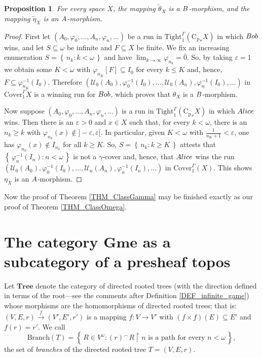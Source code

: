 \documentclass[12pt]{amsart}
\newtheorem{prop}[thm]{Proposition}
\theoremstyle{definition}
\newcommand{\set}[1]{\left\{\, {#1} \,\right\}}
\newcommand{\seq}[1]{{\left( {#1} \right)}}
\newcommand{\ali}{\textup{\textmd{\textsc{Alice}}}}
\newcommand{\bob}{\textup{\textmd{\textsc{Bob}}}}
\newcommand{\A}{\textup{\textmd{\textsc{A}}}}
\newcommand{\B}{\textup{\textmd{\textsc{B}}}}
\newcommand{\Cp}{\mathrm{C}_{\mathrm {p}}}
\DeclareMathOperator{\restrict}{\upharpoonright}
\newcommand{\mU}{{\mathcal{U}}}
\newcommand{\Tree}{\mathbf{Tree}}
\newcommand{\Gmes}{\mathbf{Gme}}
\newcommand{\Tight}{\mathrm{Tight}}
\newcommand{\Cover}{\mathrm{Cover}}
\newcommand{\Br}{\mathrm{Branch}}
\begin{document}
\begin{prop}
	For every space $X$, the mapping $\tilde{\theta}_X$ is a $\B$-morphism, and the mapping $\tilde{\eta}_X$ is an $\A$-morphism.
\end{prop}
\begin{proof}
	First let $\seq{A_0, \varphi_0, \dotsc, A_n, \varphi_n,\dotsc}$ be a run in $\Tight^\Gamma_1( {\Cp}_*X)$ in which $\bob$ wins, and let $S\subseteq\omega$ be infinite and $F\subseteq X$ be finite. We fix an increasing enumeration $S=\set{n_k:k<\omega}$ and have $\lim_{k\to\infty}\varphi_{n_k}=\bar{0}$. So, by taking $\varepsilon=1$ we obtain some $K<\omega$ with $\varphi_{n_K}[F]\subseteq I_0$ for every $k\le K$ and, hence, $F\subseteq \varphi_{n_K}^{-1}(I_0)$. Therefore $\seq{\mU_0(A_0), \varphi_0^{-1}(I_0), \dotsc,\mU_0(A_n), \varphi_n^{-1}(I_0),\dotsc}$ in $\Cover^\Gamma_1X$ is a winning run for $\bob$, which proves that $\theta_X$ is a $\B$-morphism. 
	
	Now suppose $\seq{A_0, \varphi_0, \dotsc, A_n, \varphi_n,\dotsc}$ is a run in $\Tight^\Gamma_1( {\Cp}_*X)$ in which $\ali$ wins. Then there is an $\varepsilon>0$ and $x\in X$ such that, for every $k<\omega$, there is an $n_k\ge k$ with $\varphi_{n_k}(x)\not\in ]-\varepsilon,\varepsilon[$. In particular, given $K<\omega$ with $\frac{1}{n_K+1}<\varepsilon$, one has $\varphi_{n_k}(x)\not\in I_{n_k}$ for all $k\ge K$. So, $S=\set{n_k:k\ge K}$ attests that $\set{\varphi_n^{-1}(I_n):n<\omega}$ is not a $\gamma$-cover and, hence, that $\ali$ wins the run $\seq{\mU_0(A_0), \varphi_0^{-1}(I_0), \dotsc,\mU_n(A_n), \varphi_n^{-1}(I_n),\dotsc}$ in $\Cover^\Gamma_1(X)$. This shows $\eta_X$ is an $\A$-morphism. 
\end{proof}	

Now the proof of Theorem	 \ref{THM_ClassGamma} may be finished exactly as our proof of Theorem \ref	{THM_ClassOmega}.

\section{The category \texorpdfstring{$\Gmes$}{TEXT} as a subcategory of a presheaf topos}\label{SEC_TreeTopos} 
Let $\Tree$ denote the category of directed rooted trees (with the direction defined in terms of the root---see the comments after Definition \ref{DEF_infinite_game}) whose morphisms are the homomorphisms of directed rooted trees; that is: $(V,E,r)\stackrel{f}{\to}(V',E',r')$ is a mapping $f\colon V\to V'$ with $(f\times f)(E)\subseteq E'$ and $f(r)=r'$. 
We call
\[
\Br(T) = \set{R\in V^\omega: \seq{r}^\smallfrown R\restrict n  \text{ is a path for every } n<\omega},
\]
the set of \textit{branches} of the directed rooted tree $T=(V,E,r)$.
\end{document}
